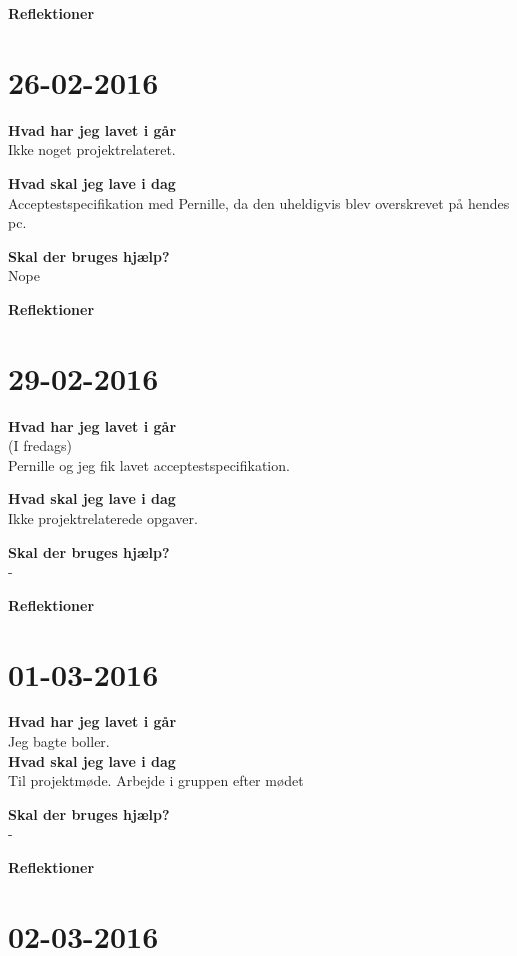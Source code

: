 \documentclass{article}
\begin{document}
	\textbf{Reflektioner}\\
	
	
	\section{26-02-2016}
		
	\textbf{Hvad har jeg lavet i går}\\
	Ikke noget projektrelateret.
		
	\textbf{Hvad skal jeg lave i dag}\\
	Acceptestspecifikation med Pernille, da den uheldigvis blev overskrevet på hendes pc.  
		
	\textbf{Skal der bruges hjælp?}\\
	Nope
		
	\textbf{Reflektioner}\\
	
	
	\section{29-02-2016}
	
	\textbf{Hvad har jeg lavet i går}\\
	(I fredags)\\
	Pernille og jeg fik lavet acceptestspecifikation.
	
	\textbf{Hvad skal jeg lave i dag}\\
	Ikke projektrelaterede opgaver.   
	
	\textbf{Skal der bruges hjælp?}\\
	-
	
	\textbf{Reflektioner}\\
	
	
	\section{01-03-2016}
	
	\textbf{Hvad har jeg lavet i går}\\
	Jeg bagte boller.\\
	
	\textbf{Hvad skal jeg lave i dag}\\
	Til projektmøde. Arbejde i gruppen efter mødet   
	
	\textbf{Skal der bruges hjælp?}\\
	-
	
	\textbf{Reflektioner}\\
	

	\section{02-03-2016}
	
\end{document}
